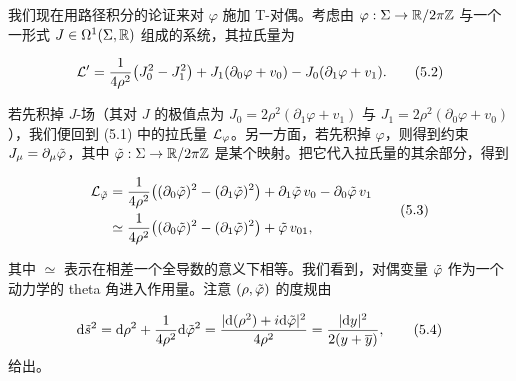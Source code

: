 
我们现在用路径积分的论证来对 $\varphi$ 施加 T-对偶。考虑由 $\varphi:\Sigma\to\mathbb{R}/2\pi\mathbb{Z}$ 与一个一形式 $J\in\Omega^1(\Sigma,\mathbb{R})$ 组成的系统，其拉氏量为

\begin{equation}
    \mathcal{L}'=\frac{1}{4\rho^2}\bigl(J_0^2-J_1^2\bigr)+J_1(\partial_0\varphi+v_0)-J_0(\partial_1\varphi+v_1).
    \tag{5.2}
\end{equation}

若先积掉 $J$-场（其对 $J$ 的极值点为 $J_0=2\rho^2(\partial_1\varphi+v_1)$ 与 $J_1=2\rho^2(\partial_0\varphi+v_0)$），我们便回到 (5.1) 中的拉氏量 $\mathcal{L}_\varphi$。另一方面，若先积掉 $\varphi$，则得到约束 $J_\mu=\partial_\mu\tilde\varphi$，其中 $\tilde\varphi:\Sigma\to\mathbb{R}/2\pi\mathbb{Z}$ 是某个映射。把它代入拉氏量的其余部分，得到

\begin{equation}
\begin{aligned}
    \mathcal{L}_{\tilde\varphi}&=\frac{1}{4\rho^2}\bigl((\partial_0\tilde\varphi)^2-(\partial_1\tilde\varphi)^2\bigr)+\partial_1\tilde\varphi\,v_0-\partial_0\tilde\varphi\,v_1\\
    &\simeq\frac{1}{4\rho^2}\bigl((\partial_0\tilde\varphi)^2-(\partial_1\tilde\varphi)^2\bigr)+\tilde\varphi\,v_{01},
\end{aligned}
    \tag{5.3}
\end{equation}

其中 $\simeq$ 表示在相差一个全导数的意义下相等。我们看到，对偶变量 $\tilde\varphi$ 作为一个动力学的 theta 角进入作用量。注意 $(\rho,\tilde\varphi)$ 的度规由

\begin{equation}
    \mathrm{d}\tilde{s}^2=\mathrm{d}\rho^2+\frac{1}{4\rho^2}\mathrm{d}\tilde\varphi^2=\frac{|\mathrm{d}(\rho^2)+i\mathrm{d}\tilde\varphi|^2}{4\rho^2}=\frac{|\mathrm{d} y|^2}{2(y+\overline{y})},
    \tag{5.4}
\end{equation}
给出。



